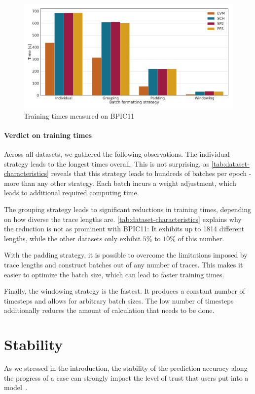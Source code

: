 \begin{figure}[!htb]
    \centering
    \includegraphics[width=\textwidth]{gfx/bpic2011/train_timings.pdf}
    \caption{Training times measured on BPIC11}
    \label{fig:BPIC11-training-timings}
\end{figure}

\paragraph{Verdict on training times}
Across all datasets, we gathered the following observations.
The individual strategy leads to the longest times overall.
This is not surprising, as \autoref{tab:dataset-characteristics} reveals that this strategy leads to hundreds of batches per epoch - more than any other strategy.
Each batch incurs a weight adjustment, which leads to additional required computing time.

The grouping strategy leads to significant reductions in training times, depending on how diverse the trace lengths are. \autoref{tab:dataset-characteristics} explains why the reduction is not as prominent with BPIC11: It exhibits up to 1814 different lengths, while the other datasets only exhibit $5\%$ to $10\%$ of this number.

With the padding strategy, it is possible to overcome the limitations imposed by trace lengths and construct batches out of any number of traces. This makes it easier to optimize the batch size, which can lead to faster training times.

Finally, the windowing strategy is the fastest.
It produces a constant number of timesteps and allows for arbitrary batch sizes.
The low number of timesteps additionally reduces the amount of calculation that needs to be done.
\FloatBarrier

\section{Stability}\label{sec:eval:stability}
As we stressed in the introduction, the stability of the prediction accuracy along the progress of a case can strongly impact the level of trust that users put into a model~\cite{metzger2015}.

